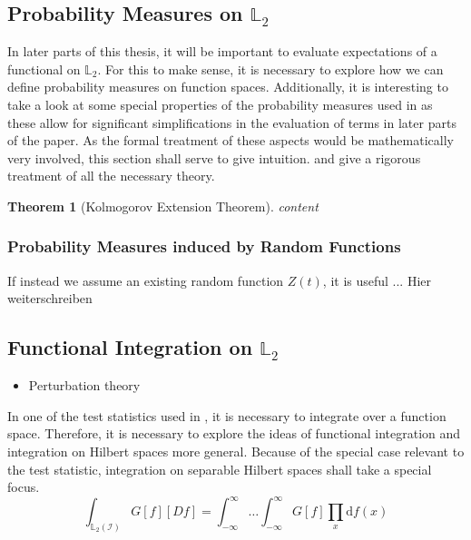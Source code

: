 \documentclass[12pt, a4paper]{article}
\theoremstyle{MAstyle} \newtheorem{assumption}{Assumption}[section]
\theoremstyle{MAstyle} \newtheorem{definition}{Definition}[section]
\theoremstyle{MAstyle} \newtheorem{theorem}{Theorem}[section]
\begin{document}
		\subsection{Probability Measures on $\mathbb{L}_2$}\label{prob_measures_l2}
			In later parts of this thesis, it will be important to evaluate expectations of a functional on $\mathbb{L}_2$. For this to make sense, it is necessary to explore how we can define probability measures on function spaces. Additionally, it is interesting to take a look at some special properties of the probability measures used in \cite{bugni_permutation_2021} as these allow for significant simplifications in the evaluation of terms in later parts of the paper. As the formal treatment of these aspects would be mathematically very involved, this section shall serve to give intuition. \cite{gihman_theory_2004} and \cite{skorohod_integration_1974} give a rigorous treatment of all the necessary theory.
			
			\begin{theorem}[Kolmogorov Extension Theorem]
				content
			\end{theorem}
		
			\subsubsection{Probability Measures induced by Random Functions}
				If instead we assume an existing random function $Z(t)$, it is useful ... {\color{red} Hier weiterschreiben}
		
		\subsection{Functional Integration on $\mathbb{L}_2$}
			\begin{itemize}
				\item Perturbation theory
			\end{itemize}
		
			In one of the test statistics used in \cite{bugni_permutation_2021}, it is necessary to integrate over a function space. Therefore, it is necessary to explore the ideas of functional integration and integration on Hilbert spaces more general. Because of the special case relevant to the test statistic, integration on separable Hilbert spaces shall take a special focus.
			\begin{equation}
				\int_{\mathbb{L}_2(\mathcal{I})} G\left[f\right] \left[Df\right] = \int_{-\infty}^{\infty}\dots\int_{-\infty}^{\infty} G\left[f\right] \prod_{x} \mathrm{d}f(x)
			\end{equation}
		
\end{document}
